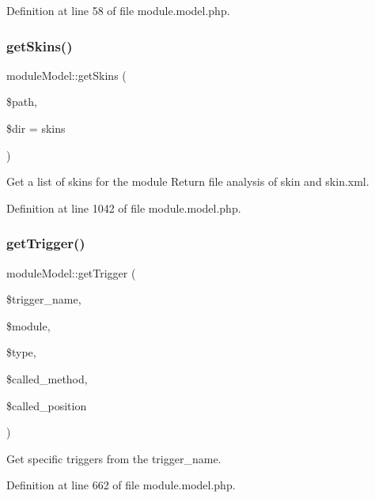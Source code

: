 Definition at line 58 of file module.\+model.\+php.

\mbox{\label{classmoduleModel_abe2d53bb2e98a672c0a776537d7471cf}} 
\subsubsection{\texorpdfstring{get\+Skins()}{getSkins()}}
{\footnotesize\ttfamily module\+Model\+::get\+Skins (\begin{DoxyParamCaption}\item[{}]{\$path,  }\item[{}]{\$dir = {\ttfamily \textquotesingle{}skins\textquotesingle{}} }\end{DoxyParamCaption})}



Get a list of skins for the module Return file analysis of skin and skin.\+xml. 



Definition at line 1042 of file module.\+model.\+php.

\mbox{\label{classmoduleModel_ae570716b47c7fd19b7fc0d217a155b22}} 
\subsubsection{\texorpdfstring{get\+Trigger()}{getTrigger()}}
{\footnotesize\ttfamily module\+Model\+::get\+Trigger (\begin{DoxyParamCaption}\item[{}]{\$trigger\+\_\+name,  }\item[{}]{\$module,  }\item[{}]{\$type,  }\item[{}]{\$called\+\_\+method,  }\item[{}]{\$called\+\_\+position }\end{DoxyParamCaption})}



Get specific triggers from the trigger\+\_\+name. 



Definition at line 662 of file module.\+model.\+php.

\mbox{\label{classmoduleModel_a979238a3b59bf52ccaa29ec3f7744808}} 
